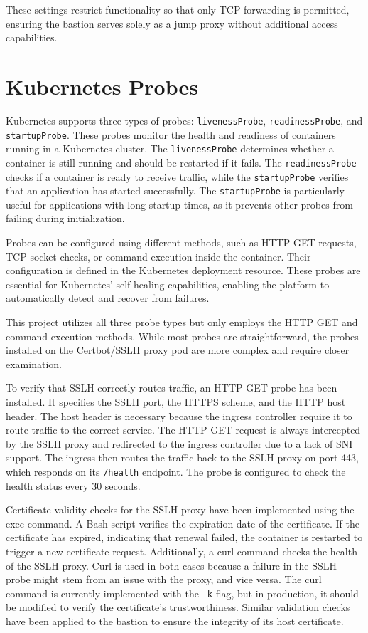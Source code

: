 These settings restrict functionality so that only TCP forwarding is permitted, ensuring the bastion serves solely as a jump proxy without additional access capabilities.

\section{Kubernetes Probes}
Kubernetes supports three types of probes: \texttt{livenessProbe}, \texttt{readinessProbe}, and \texttt{startupProbe}. These probes monitor the health and readiness of containers running in a Kubernetes cluster. The \texttt{livenessProbe} determines whether a container is still running and should be restarted if it fails. The \texttt{readinessProbe} checks if a container is ready to receive traffic, while the \texttt{startupProbe} verifies that an application has started successfully. The \texttt{startupProbe} is particularly useful for applications with long startup times, as it prevents other probes from failing during initialization.

Probes can be configured using different methods, such as HTTP GET requests, TCP socket checks, or command execution inside the container. Their configuration is defined in the Kubernetes deployment resource. These probes are essential for Kubernetes' self-healing capabilities, enabling the platform to automatically detect and recover from failures.

This project utilizes all three probe types but only employs the HTTP GET and command execution methods. While most probes are straightforward, the probes installed on the Certbot/SSLH proxy pod are more complex and require closer examination.

To verify that SSLH correctly routes traffic, an HTTP GET probe has been installed. It specifies the SSLH port, the HTTPS scheme, and the HTTP host header. The host header is necessary because the ingress controller require it to route traffic to the correct service. The HTTP GET request is always intercepted by the SSLH proxy and redirected to the ingress controller due to a lack of SNI support. The ingress then routes the traffic back to the SSLH proxy on port 443, which responds on its \texttt{/health} endpoint. The probe is configured to check the health status every 30 seconds.

Certificate validity checks for the SSLH proxy have been implemented using the exec command. A Bash script verifies the expiration date of the certificate. If the certificate has expired, indicating that renewal failed, the container is restarted to trigger a new certificate request. Additionally, a curl command checks the health of the SSLH proxy. Curl is used in both cases because a failure in the SSLH probe might stem from an issue with the proxy, and vice versa. The curl command is currently implemented with the \texttt{-k} flag, but in production, it should be modified to verify the certificate's trustworthiness. Similar validation checks have been applied to the bastion to ensure the integrity of its host certificate.


